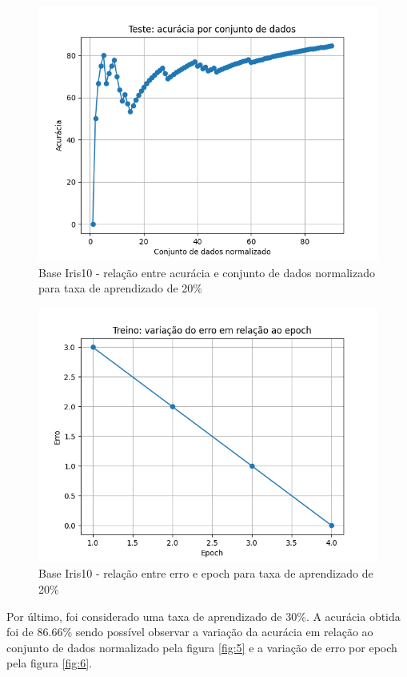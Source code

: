 \documentclass[12pt, %
openright, 
oneside, %
a4paper,    %
brazil]{facom-ufu-abntex2}
\begin{document}
\begin{figure}[H]
\centering
\includegraphics[scale=0.9]{figuras/acuracia_2.png}
\caption{Base Iris10 - relação entre acurácia e conjunto de dados normalizado para taxa de aprendizado de 20\%}
\label{fig:3}
\end{figure}
\begin{figure}[H]
\centering
\includegraphics[scale=0.9]{figuras/erro_2.png}
\caption{Base Iris10 - relação entre erro e epoch para taxa de aprendizado de 20\%}
\label{fig:4}
\end{figure}

Por último, foi considerado uma taxa de aprendizado de 30\%. A acurácia obtida foi de 86.66\% sendo possível observar a variação da acurácia em relação ao conjunto de dados normalizado pela figura \ref{fig:5} e a variação de erro por epoch pela figura \ref{fig:6}.
\end{document}
